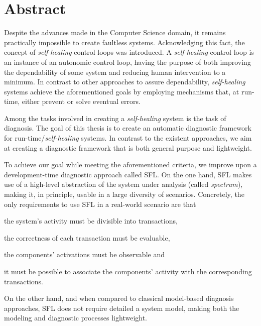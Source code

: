 \renewcommand{\BrainFuckChapter}{
{+}{+}{+}{+}{+}{+}{+}{+}{[}{>}{+}{+}{+}{+}{>}{+}{+}{+}{+}{+}{+}{>}{+}{+}{+}{+}{+}{+}{+}{+}{>}{+}{+}{+}{+}{+}{+}{+}{+}{+}{+}{>}{+}{+}{+}{+}{+}{+}{+}{+}{+}{+}{+}{+}{<}{<}{<}{<}{<}{-}{]}{>}{>}{>}{+}{.}{>}{>}{+}{+}
{.}{+}{+}{+}{+}{+}{+}{+}{+}{+}{+}{+}{+}{+}{+}{+}{+}{+}{.}{+}{.}{-}{-}{.}{<}{+}{+}{+}{+}{+}{+}{+}{+}{+}{+}{+}{+}{+}{+}{+}{+}{+}{.}{+}{+}{.}{>}{+}{+}{.}{[}{>}{]}{<}{[}{[}{-}{]}{<}{]}{<}{<}{-}{<}{+}{+}{-}{<}{-}{-}
}
\chapter*{Abstract}


Despite the advances made in the Computer Science domain, it remains
practically impossible to create faultless systems.
%
Acknowledging this fact, the concept of \emph{self-healing} control
loops was introduced.
%
A \emph{self-healing} control loop is an instance of an autonomic
control loop, having the purpose of both improving the dependability
of some system and reducing human intervention to a minimum.
%
In contrast to other approaches to assure dependability,
\emph{self-healing} systems achieve the aforementioned goals by
employing mechanisms that, at run-time, either prevent or solve
eventual errors.



Among the tasks involved in creating a \emph{self-healing} system is
the task of diagnosis.
%
The goal of this thesis is to create an automatic diagnostic framework
for run-time/\emph{self-healing} systems.
%
In contrast to the existent approaches, we aim at creating a
diagnostic framework that is both general purpose and lightweight.



To achieve our goal while meeting the aforementioned criteria, we
improve upon a development-time diagnostic approach called \ac{SFL}.
%
On the one hand, \ac{SFL} makes use of a high-level abstraction of the
system under analysis (called \emph{spectrum}), making it, in
principle, usable in a large diversity of scenarios.
%
Concretely, the only requirements to use \ac{SFL} in a real-world scenario are
that
\begin{inparaenum}[(1)]
\item the system's activity must be divisible into transactions,
\item the correctness of each transaction must be evaluable,
\item the components' activations must be observable and
\item it must be possible to associate the components' activity with
  the corresponding transactions.
\end{inparaenum}
%
On the other hand, and when compared to classical model-based
diagnosis approaches, \ac{SFL} does not require detailed a system
model, making both the modeling and diagnostic processes lightweight.
%



